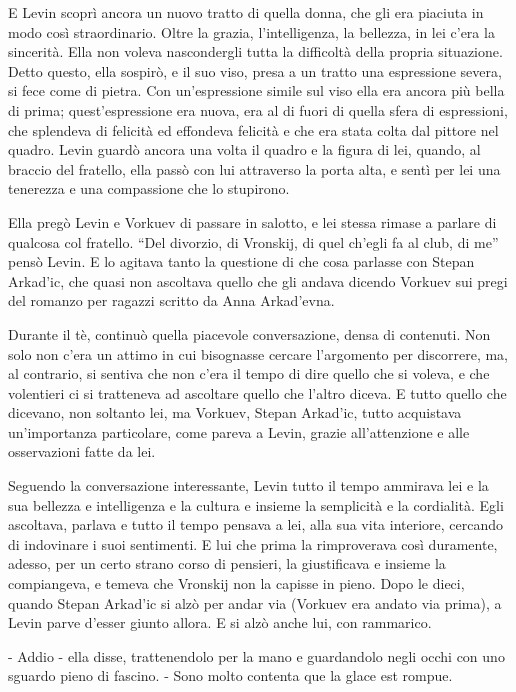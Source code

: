 E Levin scoprì ancora un nuovo tratto di quella donna, che gli era piaciuta in modo così straordinario. Oltre la grazia, l'intelligenza, la bellezza, in lei c'era la sincerità. Ella non voleva nascondergli tutta la difficoltà della propria situazione. Detto questo, ella sospirò, e il suo viso, presa a un tratto una espressione severa, si fece come di pietra. Con un'espressione simile sul viso ella era ancora più bella di prima; quest'espressione era nuova, era al di fuori di quella sfera di espressioni, che splendeva di felicità ed effondeva felicità e che era stata colta dal pittore nel quadro. Levin guardò ancora una volta il quadro e la figura di lei, quando, al braccio del fratello, ella passò con lui attraverso la porta alta, e sentì per lei una tenerezza e una compassione che lo stupirono. 

Ella pregò Levin e Vorkuev di passare in salotto, e lei stessa rimase a parlare di qualcosa col fratello. ``Del divorzio, di Vronskij, di quel ch'egli fa al club, di me'' pensò Levin. E lo agitava tanto la questione di che cosa parlasse con Stepan Arkad'ic, che quasi non ascoltava quello che gli andava dicendo Vorkuev sui pregi del romanzo per ragazzi scritto da Anna Arkad'evna. 

Durante il tè, continuò quella piacevole conversazione, densa di contenuti. Non solo non c'era un attimo in cui bisognasse cercare l'argomento per discorrere, ma, al contrario, si sentiva che non c'era il tempo di dire quello che si voleva, e che volentieri ci si tratteneva ad ascoltare quello che l'altro diceva. E tutto quello che dicevano, non soltanto lei, ma Vorkuev, Stepan Arkad'ic, tutto acquistava un'importanza particolare, come pareva a Levin, grazie all'attenzione e alle osservazioni fatte da lei. 

Seguendo la conversazione interessante, Levin tutto il tempo ammirava lei e la sua bellezza e intelligenza e la cultura e insieme la semplicità e la cordialità. Egli ascoltava, parlava e tutto il tempo pensava a lei, alla sua vita interiore, cercando di indovinare i suoi sentimenti. E lui che prima la rimproverava così duramente, adesso, per un certo strano corso di pensieri, la giustificava e insieme la compiangeva, e temeva che Vronskij non la capisse in pieno. Dopo le dieci, quando Stepan Arkad'ic si alzò per andar via (Vorkuev era andato via prima), a Levin parve d'esser giunto allora. E si alzò anche lui, con rammarico. 

- Addio - ella disse, trattenendolo per la mano e guardandolo negli occhi con uno sguardo pieno di fascino. - Sono molto contenta que la glace est rompue. 

